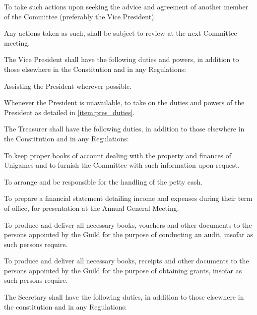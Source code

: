 \documentclass[a4paper]{article}
\begin{document}
\begin{myEnumerate}
\begin{myEnumerate}
                        \begin{myEnumerate}
                            \item To take such actions upon seeking the advice and agreement of another member of the Committee (preferably the Vice President).
                            \item Any actions taken as such, shall be subject to review at the next Committee meeting.
                        \end{myEnumerate}
              \end{myEnumerate}
        \item The Vice President shall have the following duties and powers, in addition to those elsewhere in the Constitution and in any Regulations:
              \begin{myEnumerate}
                  \item Assisting the President wherever possible.
                  \item Whenever the President is unavailable, to take on the duties and powers of the President as detailed in \cref{item:pres_duties}.
              \end{myEnumerate}
        \item The Treasurer shall have the following duties, in addition to those elsewhere in the Constitution and in any Regulations:
              \begin{myEnumerate}
                  \item To keep proper books of account dealing with the property and finances of Unigames and to furnish the Committee with such information upon request.
                  \item To arrange and be responsible for the handling of the petty cash.
                  \item To prepare a financial statement detailing income and expenses during their term of office, for presentation at the Annual General Meeting.
                  \item To produce and deliver all necessary books, vouchers and other documents to the persons appointed by the Guild for the purpose of conducting an audit, insofar as such persons require.
                  \item To produce and deliver all necessary books, receipts and other documents to the persons appointed by the Guild for the purpose of obtaining grants, insofar as such persons require.
              \end{myEnumerate}
        \item The Secretary shall have the following duties, in addition to those elsewhere in the constitution and in any Regulations:

\end{myEnumerate}
\end{document}
